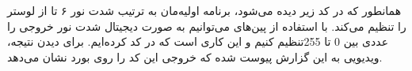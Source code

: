 \documentclass[12pt,a4paper]{article}
\begin{document}
همانطور که در کد زیر دیده می‌شود، برنامه اولیه‌مان به ترتیب شدت نور ۶ تا  از لوستر را تنظیم می‌کند. با استفاده از پین‌های  می‌توانیم به صورت دیجیتال شدت نور خروجی را عددی بین 0 تا 255تنظیم کنیم و این کاری است که در کد کرده‌ایم. برای دیدن نتیجه، ویدیویی به این گزارش پیوست شده که خروجی این کد را روی بورد نشان می‌دهد.
\begin{latin}
	
\end{latin}
\end{document}
